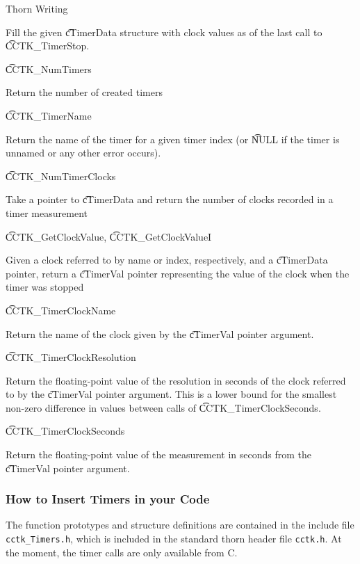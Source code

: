 \begin{cactuspart}{Thorn Writing}
\begin{Lentry}
Fill the given {\t cTimerData} structure with clock values as of
the last call to {\t CCTK\_TimerStop}.

\item[{\t CCTK\_NumTimers}]

Return the number of created timers

\item[{\t CCTK\_TimerName}]

Return the name of the timer for a given timer index (or {\t NULL} if 
the timer is unnamed or any other error occurs).

\item[{\t CCTK\_NumTimerClocks}]

Take a pointer to {\t cTimerData} and return the number of clocks 
recorded in a timer measurement

\item[{\t CCTK\_GetClockValue}, {\t CCTK\_GetClockValueI}]

Given a clock referred to by name or index, respectively, and a 
{\t cTimerData} pointer, return a {\t cTimerVal} pointer representing
the value of the clock when the timer was stopped

\item[{\t CCTK\_TimerClockName}]

Return the name of the clock given by the {\t cTimerVal} pointer argument.

\item[{\t CCTK\_TimerClockResolution}]

Return the floating-point value of the resolution in seconds 
of the clock referred to by the {\t cTimerVal} pointer argument.
This is a lower bound for the smallest non-zero difference in values
between calls of {\t CCTK\_TimerClockSeconds}.

\item[{\t CCTK\_TimerClockSeconds}]

Return the floating-point value of the measurement in seconds 
from the {\t cTimerVal} pointer argument.

\end{Lentry}

\subsubsection{How to Insert Timers in your Code}

The function prototypes and structure definitions are contained in the
include file \texttt{cctk\_Timers.h}, which is included in the standard
thorn header file \texttt{cctk.h}. At the moment, the timer calls are only
available from C.


\end{cactuspart}
